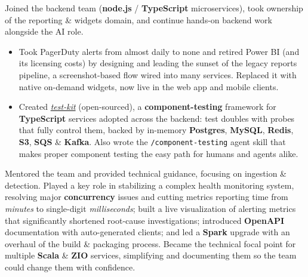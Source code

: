 \documentclass[10pt]{cv}
\newcommand{\kw}[1]{\textbf{#1}}
\begin{document}
\begin{flushleft}
        Joined the backend team (\kw{node.js} / \kw{TypeScript} microservices), took ownership of the reporting \& widgets domain,
        and continue hands-on backend work alongside the AI role.
        \begin{itemize}
            \item Took PagerDuty alerts from almost daily to none and retired Power BI (and its licensing costs) by designing and leading the sunset
                  of the legacy reports pipeline, a screenshot-based flow wired into many services. Replaced it with native on-demand widgets,
                  now live in the web app and mobile clients.
            \item Created \href{https://github.com/hochgi/test-kit}{\emph{test-kit}} (open-sourced), a \kw{component-testing} framework for \kw{TypeScript}
                  services adopted across the backend: test doubles with probes that fully control them, backed by in-memory \kw{Postgres}, \kw{MySQL},
                  \kw{Redis}, \kw{S3}, \kw{SQS} \& \kw{Kafka}. Also wrote the \texttt{/component-testing} agent skill that makes proper component
                  testing the easy path for humans and agents alike.
        \end{itemize}




        Mentored the team and provided technical guidance, focusing on ingestion \& detection. Played a key role in stabilizing a complex
        health monitoring system, resolving major \kw{concurrency} issues and cutting metrics reporting time from \emph{minutes} to single-digit
        \emph{milliseconds}; built a live visualization of alerting metrics that significantly shortened root-cause investigations; introduced
        \kw{OpenAPI} documentation with auto-generated clients; and led a \kw{Spark} upgrade with an overhaul of the build \& packaging process.
        Became the technical focal point for multiple \kw{Scala} \& \kw{ZIO} services, simplifying and documenting them so the team could change them with confidence.



            \newpage %



\end{flushleft}
\end{document}
